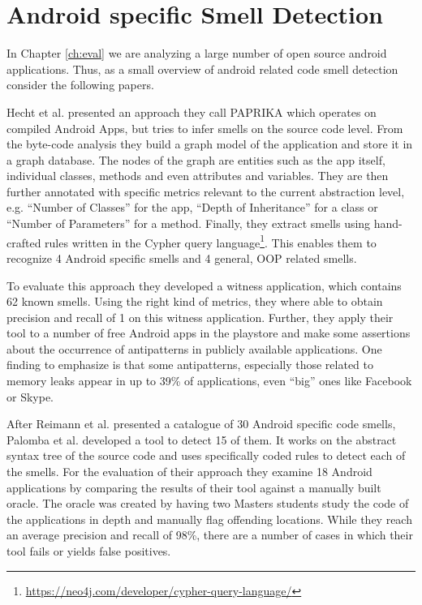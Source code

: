 
\section{Android specific Smell Detection}

In Chapter \ref{ch:eval} we are analyzing a large number of open source android applications.
Thus, as a small overview of android related code smell detection consider the following papers.

Hecht et al. \cite{hecht2015detecting} presented an approach they call PAPRIKA which operates on compiled Android Apps, but tries to infer smells on the source code level.
From the byte-code analysis they build a graph model of the application and store it in a graph database.
The nodes of the graph are entities such as the app itself, individual classes, methods and even attributes and variables.
They are then further annotated with specific metrics relevant to the current abstraction level, e.g. ``Number of Classes'' for the app, ``Depth of Inheritance'' for a class or ``Number of Parameters'' for a method.
Finally, they extract smells using hand-crafted rules written in the Cypher query language\footnote{\url{https://neo4j.com/developer/cypher-query-language/}}.
This enables them to recognize 4 Android specific smells and 4 general, OOP related smells.

To evaluate this approach they developed a witness application, which contains 62 known smells.
Using the right kind of metrics, they where able to obtain precision and recall of 1 on this witness application.
Further, they apply their tool to a number of free Android apps in the playstore and make some assertions about the occurrence of antipatterns in publicly available applications.
One finding to emphasize is that some antipatterns, especially those related to memory leaks appear in up to 39\% of applications, even ``big'' ones like Facebook or Skype.

After Reimann et al. \cite{reimann2014tool} presented a catalogue of 30 Android specific code smells, Palomba et al. \cite{palomba2017lightweight} developed a tool to detect 15 of them.
It works on the abstract syntax tree of the source code and uses specifically coded rules to detect each of the smells.
For the evaluation of their approach they examine 18 Android applications by comparing the results of their tool against a manually built oracle.
The oracle was created by having two Masters students study the code of the applications in depth and manually flag offending locations.
While they reach an average precision and recall of 98\%, there are a number of cases in which their tool fails or yields false positives.

